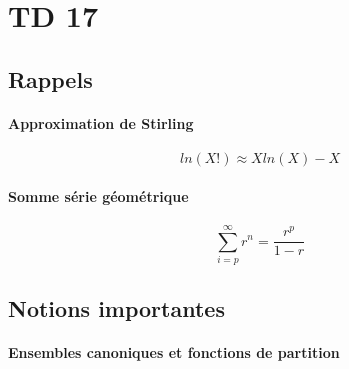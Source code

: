 \section{TD 17}


\subsection{Rappels}


\paragraph{Approximation de Stirling} 
$$ ln(X!)\approx Xln(X) - X$$


\paragraph{Somme série géométrique}
$$ \sum_{i=p}^\infty r^n=\frac{r^p}{1-r}$$


\subsection{Notions importantes}


\paragraph{Ensembles canoniques et fonctions de partition}

